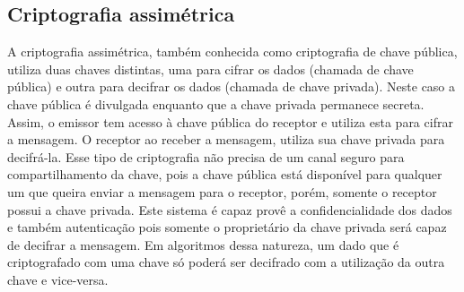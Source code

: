 \subsection{Criptografia assimétrica}
A criptografia assimétrica, também conhecida como criptografia de chave pública, utiliza duas chaves distintas, uma para cifrar os dados (chamada de chave pública) e outra para decifrar os dados (chamada de chave privada). Neste caso a chave pública é divulgada enquanto que a chave privada permanece secreta. Assim, o emissor tem acesso à chave pública do receptor e utiliza esta para cifrar a mensagem. O receptor ao receber a mensagem, utiliza sua chave privada para decifrá-la. Esse tipo de criptografia não precisa de um canal seguro para compartilhamento da chave, pois a chave pública está disponível para qualquer um que queira enviar a mensagem para o receptor, porém, somente o receptor possui a chave privada.
Este sistema é capaz provê a confidencialidade dos dados e também autenticação pois somente o proprietário da chave privada será capaz de decifrar a mensagem. Em algoritmos dessa natureza, um dado que é criptografado com uma chave só poderá ser decifrado com a utilização da outra chave e vice-versa.

